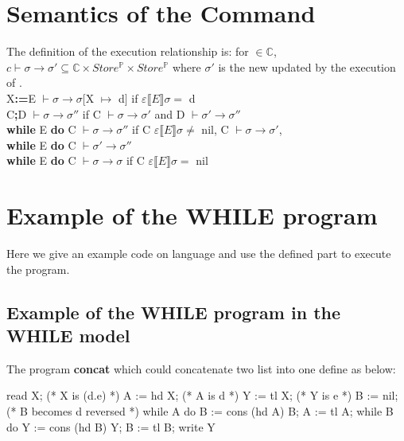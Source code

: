 \section{Semantics of the Command}\label{appendix:semantics of command}
The definition of the execution relationship is: for  $\in \mathds{C}$, $c \vdash \sigma \rightarrow \sigma' \subseteq \mathds{C} \times Store^{\mathds{P}} \times Store^{\mathds{P}}$ where $\sigma'$ is the new  updated by the execution of  .\\
X\textbf{:=}E $\vdash\sigma \rightarrow \sigma[$X $\mapsto$ d$]$ \hspace{1.15cm}if \hspace{0.2cm} $\varepsilon \llbracket E \rrbracket \sigma = $ d\\
C\textbf{;}D $\vdash\sigma \rightarrow \sigma''$ \hspace{2.8cm}if \hspace{0.2cm} C $\vdash\sigma \rightarrow \sigma'$ and D $\vdash\sigma' \rightarrow \sigma''$\\
\textbf{while} E \textbf{do} C $\vdash\sigma \rightarrow \sigma''$ \hspace{0.95cm}if \hspace{0.2cm} C $\varepsilon \llbracket E \rrbracket \sigma \neq $ nil, C $\vdash\sigma \rightarrow \sigma'$,\\ \indent\hspace{8.3cm}\textbf{while} E \textbf{do} C $\vdash\sigma' \rightarrow \sigma''$\\
\textbf{while} E \textbf{do} C $\vdash\sigma \rightarrow \sigma$ \hspace{1.15cm}if \hspace{0.2cm} C $\varepsilon \llbracket E \rrbracket\sigma = $ nil\\

\section{Example of the WHILE program}\label{appendix:while example}
Here we give an example code on \WHILE language and use the defined part to execute the program. 
\subsection{Example of the WHILE program in the WHILE model}
The \WHILE program \textbf{concat} which could concatenate two list into one define as below:
\begin{code}
read X; (* X is (d.e) *)
  A := hd X; (* A is d *)
  Y := tl X; (* Y is e *)
  B := nil; (* B becomes d reversed *)
  while A do
    B := cons (hd A) B;
    A := tl A;
  while B do
    Y := cons (hd B) Y;
    B := tl B;
write Y
\end{code}
